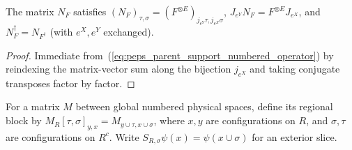 \begin{lemma}%
    \label{thm:peps_parent_support_global_coordinates}
    \leanok
    The matrix $N_F$ satisfies
    $(N_F)_{\tau,\sigma}=(F^{\otimes E})_{j_{e^Y}\tau,j_{e^X}\sigma}$,
    $J_{e^Y}N_F=F^{\otimes E}J_{e^X}$, and $N_F^\dagger=N_{F^\dagger}$ (with
    $e^X,e^Y$ exchanged).
\end{lemma}
\begin{proof}\leanok
    Immediate from~(\ref{eq:peps_parent_support_numbered_operator}) by
    reindexing the matrix-vector sum along the bijection $j_{e^X}$ and
    taking conjugate transposes factor by factor.
\end{proof}

\begin{definition}%
    \label{def:peps_parent_support_operator_block}
    \leanok
    For a matrix $M$ between global numbered physical spaces, define
    its regional block by
    $M_R[\tau,\sigma]_{y,x}=M_{y\cup\tau,x\cup\sigma}$,
    where $x,y$ are configurations on $R$, and $\sigma,\tau$ are
    configurations on $R^c$. Write
    $S_{R,\sigma}\psi(x)=\psi(x\cup\sigma)$ for an exterior slice.
\end{definition}

